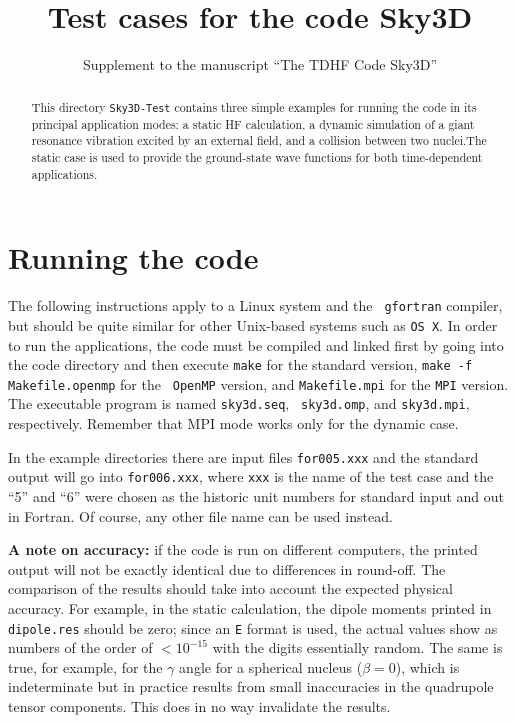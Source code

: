 \documentclass[A4]{elsarticle}
\begin{document}
\title{Test cases for the code Sky3D}

\author{Supplement to the manuscript ``{The TDHF Code Sky3D}''}

\begin{abstract}
This directory {\tt Sky3D-Test} contains three simple examples for
running the code in its principal application modes: a static HF
calculation, a dynamic simulation of a giant resonance vibration
excited by an external field, and a collision between two nuclei.The
static case is used to provide the ground-state wave functions for
both time-dependent applications.
\end{abstract}

\maketitle
\section{Running the code}
The following instructions apply to a Linux system and the {\tt
  gfortran} compiler, but should be
quite similar for other Unix-based systems such as {\tt OS~X}.
In order to run the applications, the code must be compiled and linked
first by going into the code directory and then execute {\tt make} for
the standard version, {\tt make -f Makefile.openmp} for the {\tt
  OpenMP} version, and {\tt Makefile.mpi} for the {\tt MPI}
version. The executable program is named {\tt sky3d.seq}, {\tt
  sky3d.omp}, and {\tt sky3d.mpi}, respectively. Remember that MPI mode
works only for the dynamic case.

In the example directories there are input files {\tt for005.xxx} and
the standard output will go into {\tt for006.xxx}, where {\tt xxx} is
the name of the test case and the ``5'' and ``6'' were chosen as the
historic unit numbers for standard input and out in Fortran. Of
course, any other file name can be used instead.

{\bf A note on accuracy:} if the code is run on different computers,
the printed output will not be exactly identical due to differences in
round-off. The comparison of the results should take into account the
expected physical accuracy. For example, in the static calculation,
the dipole moments printed in {\tt dipole.res} should be zero; since
an {\tt E} format is used, the actual values show as numbers of the
order of $<10^{-15}$ with the digits essentially random. The same is
true, for example, for the $\gamma$ angle for a spherical nucleus
($\beta=0$), which is indeterminate but in practice results from small
inaccuracies in the quadrupole tensor components.  This
does in no way invalidate the results.
\end{document}
